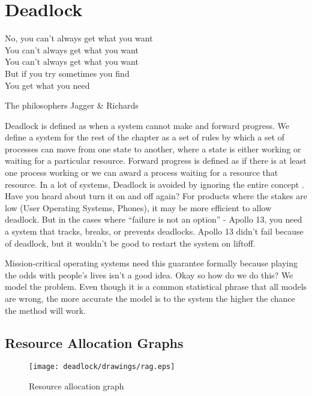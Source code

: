 \chapter{Deadlock}

\epigraph{No, you can't always get what you want
\\You can't always get what you want
\\You can't always get what you want
\\But if you try sometimes you find
\\You get what you need}{The philosophers Jagger \& Richards}

\gls{Deadlock} is defined as when a system cannot make and forward progress.
We define a system for the rest of the chapter as a set of rules by which a set of processes can move from one state to another, where a state is either working or waiting for a particular resource.
Forward progress is defined as if there is at least one process working or we can award a process waiting for a resource that resource.
In a lot of systems, Deadlock is avoided by ignoring the entire concept \cite[P.237]{silberschatz2006operating}.
Have you heard about turn it on and off again?
For products where the stakes are low (User Operating Systems, Phones), it may be more efficient to allow deadlock.
But in the cases where ``failure is not an option'' - Apollo 13, you need a system that tracks, breaks, or prevents deadlocks.
Apollo 13 didn't fail because of deadlock, but it wouldn't be good to restart the system on liftoff.

Mission-critical operating systems need this guarantee formally because playing the odds with people's lives isn't a good idea.
Okay so how do we do this? We model the problem.
Even though it is a common statistical phrase that all models are wrong, the more accurate the model is to the system the higher the chance the method will work.

\section{Resource Allocation Graphs}

\begin{figure}[H]
\centering
\texttt{[image: deadlock/drawings/rag.eps]}
\caption{Resource allocation graph}
\label{ragfigure}
\end{figure}

